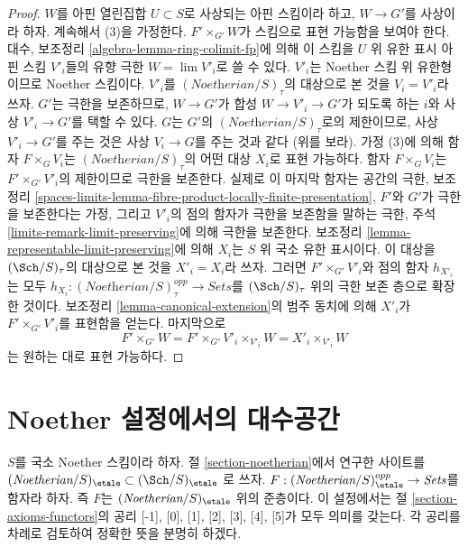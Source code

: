 \begin{proof}
\medskip\noindent
$W$를 아핀 열린집합 $U \subset S$로 사상되는 아핀 스킴이라 하고,
$W \to G'$를 사상이라 하자. 계속해서 (3)을 가정한다.
$F' \times_{G'} W$가 스킴으로 표현 가능함을 보여야 한다.
대수, 보조정리 \ref{algebra-lemma-ring-colimit-fp}에 의해
이 스킴을 $U$ 위 유한 표시 아핀 스킴 $V'_i$들의 유향 극한
$W = \lim V'_i$로 쓸 수 있다.
$V'_i$는 Noether 스킴 위 유한형이므로 Noether 스킴이다.
$V'_i$를 $(\textit{Noetherian}/S)_\tau$의 대상으로 본 것을
$V_i = V'_i$라 쓰자. $G'$는 극한을 보존하므로,
$W \to G'$가 합성 $W \to V'_i \to G'$가 되도록 하는 $i$와 사상
$V'_i \to G'$를 택할 수 있다.
$G$는 $G'$의 $(\textit{Noetherian}/S)_\tau$로의 제한이므로,
사상 $V'_i \to G'$를 주는 것은 사상 $V_i \to G$를 주는 것과 같다
(위를 보라). 가정 (3)에 의해 함자 $F \times_G V_i$는
$(\textit{Noetherian}/S)_\tau$의 어떤 대상 $X_i$로 표현 가능하다.
함자 $F \times_G V_i$는 $F' \times_{G'} V'_i$의 제한이므로 극한을 보존한다.
실제로 이 마지막 함자는 공간의 극한, 보조정리
\ref{spaces-limits-lemma-fibre-product-locally-finite-presentation},
$F'$와 $G'$가 극한을 보존한다는 가정, 그리고 $V'_i$의 점의 함자가
극한을 보존함을 말하는 극한, 주석
\ref{limits-remark-limit-preserving}에 의해 극한을 보존한다.
보조정리 \ref{lemma-representable-limit-preserving}에 의해
$X_i$는 $S$ 위 국소 유한 표시이다.
이 대상을 $(\Sch/S)_\tau$의 대상으로 본 것을 $X'_i = X_i$라 쓰자.
그러면 $F' \times_{G'} V'_i$와
점의 함자 $h_{X'_i}$는 모두
$h_{X_i} : (\textit{Noetherian}/S)_\tau^{opp} \to \textit{Sets}$를
$(\Sch/S)_\tau$ 위의 극한 보존 층으로 확장한 것이다.
보조정리 \ref{lemma-canonical-extension}의 범주 동치에 의해
$X'_i$가 $F' \times_{G'} V'_i$를 표현함을 얻는다. 마지막으로
$$ 
F' \times_{G'} W = F' \times_{G'} V'_i \times_{V'_i} W =
X'_i \times_{V'_i} W
$$
는 원하는 대로 표현 가능하다.
\end{proof}






\section{Noether 설정에서의 대수공간}
\label{section-algebraic-spaces-noetherian}

\noindent
$S$를 국소 Noether 스킴이라 하자. 절 \ref{section-noetherian}에서
연구한 사이트를
$(\textit{Noetherian}/S)_\etale \subset (\Sch/S)_\etale$
로 쓰자. $F : (\textit{Noetherian}/S)_\etale^{opp} \to \textit{Sets}$를
함자라 하자. 즉 $F$는 $(\textit{Noetherian}/S)_\etale$ 위의 준층이다.
이 설정에서는 절 \ref{section-axioms-functors}의 공리
[-1], [0], [1], [2], [3], [4], [5]가 모두 의미를 갖는다.
각 공리를 차례로 검토하여 정확한 뜻을 분명히 하겠다.

